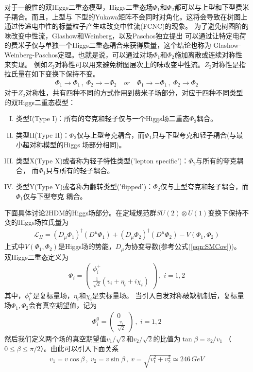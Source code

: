 对于一般性的双Higgs二重态模型，Higgs二重态场$\Phi_1$和$\Phi_2$都可以与上型和下型费米子耦合。而且，上型与
下型的Yukawa矩阵不会同时对角化。这将会导致在树图上通过传递电中性的标量粒子产生味改变中性流(FCNC)的现象。
为了避免树图阶的味改变中性流，Glashow和Weinberg\cite{GW:2hdm}，以及Paschos\cite{Paschos:2hdm}独立提出
可以通过让特定电荷的费米子仅与单独一个Higgs二重态耦合来获得质量，这个结论也称为
Glashow-Weinberg-Paschos定理。也就是说，可以通过对场$\Phi_1$和$\Phi_2$施加离散或连续对称性来实现。
例如$Z_2$对称性可以用来避免树图层次上的味改变中性流。$Z_2$对称性是指拉氏量在如下变换下保持不变。
\begin{eqnarray}
\Phi_1 \to \Phi_1 \,, \; \Phi_2 \to -\Phi_2 \quad or \quad
\Phi_1 \to -\Phi_1 \,, \; \Phi_2 \to \Phi_2
\end{eqnarray}
对于$Z_2$对称性，共有四种不同的方式作用到费米子场部分，对应于四种不同类型的双Higgs二重态模型：
\begin{enumerate}[(I)]
\item 类型I(Type I)：所有的夸克和轻子仅与一个Higgs场二重态$\Phi_2$耦合。 
\item 类型II(Type II)：$\Phi_2$仅与上型夸克耦合，而$\Phi_1$只与下型夸克和轻子耦合(与最小超对称模型的Higgs
场部分相同)。
\item 类型X(Type X)或者称为轻子特性类型('lepton specific')：$\Phi_2$与所有的夸克耦合，
而$\Phi_1$只与所有的轻子耦合。
\item 类型Y(Type Y)或者称为翻转类型('flipped')：$\Phi_2$仅与上型夸克和轻子耦合，而$\Phi_1$仅与下型夸克
耦合。
\end{enumerate}

下面具体讨论2HDM的Higgs场部分。在定域规范群$SU(2) \otimes U(1)$变换下保持不变的Higgs场拉氏量为
\begin{eqnarray}
\mathscr{L}_H =  (D_{\mu}\Phi_1)^{\dagger}(D^{\mu}\Phi_1) + (D_{\mu}\Phi_2)^{\dagger}(D^{\mu}\Phi_2) - 
V(\Phi_1, \Phi_2)
\end{eqnarray}
上式中$V(\Phi_1,\Phi_2)$是Higgs场的势能，$D_{\mu}$为协变导数(参考公式(\ref{eqn:SMCov}))。
双Higgs二重态定义为
\begin{eqnarray}
\Phi_i = \left(\begin{array}{c} \phi^+_i \\ \frac{1}{\sqrt 2}(v_i + \eta_i + i\chi_i)\end{array}\right)
\, , \; i= 1, 2
\end{eqnarray}
其中，$\phi^+_i$是复标量场，$\eta_i$和$\chi_i$是实标量场。
当引入自发对称破缺机制后，复标量场$\Phi_1, \Phi_2$会有真空期望值，记为
\begin{eqnarray}
\Phi^0_i = \left(\begin{array}{c} 0 \\ \frac{v_i}{\sqrt 2} \end{array} \right) \, , \; i = 1, 2
\end{eqnarray}
然后我们定义两个场的真空期望值$v_1/\sqrt{2}$和$v_2/\sqrt{2}$的比值为$\tan\beta = v_2/v_1$
（$0 \le \beta \le \pi/2$）。由此可以引入下面关系
\begin{eqnarray}
v_1 = v\cos\beta\,, \; v_2 = v\sin\beta\,, \; v = \sqrt{v^2_1+v^2_2} \simeq 246\,GeV
\end{eqnarray}

